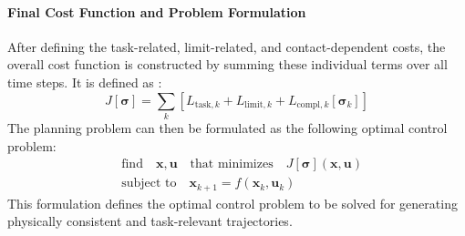 \documentclass[main.tex]{subfiles}
\begin{document}
\begin{sloppypar}
\paragraph{Final Cost Function and Problem Formulation}
After defining the task-related, limit-related, and contact-dependent costs, the overall cost function is constructed by summing these individual terms over all time steps. It is defined as :
\begin{equation}
J[\boldsymbol{\sigma}] = \sum_k \left[ L_{\text{task},k} + L_{\text{limit},k} + L_{\text{compl},k}[\boldsymbol{\sigma}_k] \right]
\end{equation}
The planning problem can then be formulated as the following optimal control problem:
\begin{equation}
\begin{aligned}
& \text{find} \quad \mathbf{x}, \mathbf{u} \quad \text{that minimizes} \quad J[\boldsymbol{\sigma}](\mathbf{x},\mathbf{u}) \\
& \text{subject to} \quad \mathbf{x}_{k+1} = f(\mathbf{x}_k, \mathbf{u}_k)
\end{aligned}
\end{equation}
This formulation defines the optimal control problem to be solved for generating physically consistent and task-relevant trajectories.
\begin{comment}
This problem is formulated using a \textit{single shooting} approach, where the control inputs are directly optimized and the states are obtained by integrating the system dynamics forward in time. 
Due to the nonlinearities in the cost terms (especially those involving contact forces and constraints) and the system dynamics, the resulting optimization is generally a \textit{nonlinear programming problem} (NLP). However, in certain cases where the dynamics and cost functions are affine and the constraints are quadratic, the problem structure could be approximated as a \textit{quadratic programming} (QP) problem to enable faster computation.
Overall, the optimization simultaneously enforces task tracking, physical feasibility, and complementarity conditions related to contact interactions throughout the planned motion.
\end{comment}

\end{sloppypar}
\end{document}
